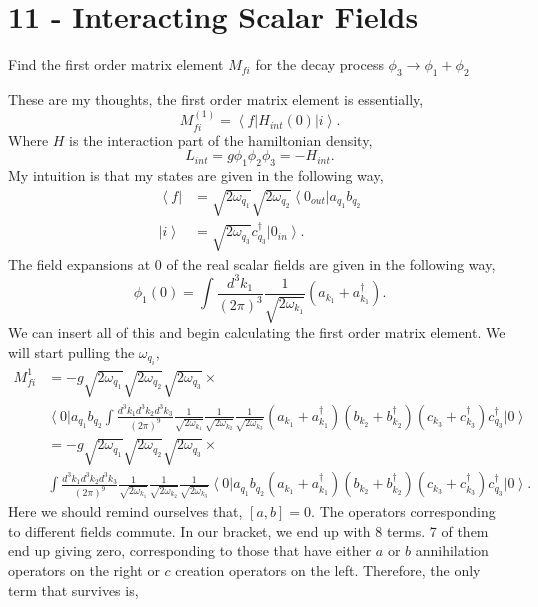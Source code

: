 \documentclass[working, oneside]{../../Preambles/tuftebook}
\begin{document}
\let\cleardoublepage\clearpage
\thispagestyle{fancy}
\chapter{11 - Interacting Scalar Fields}
\begin{exercise}[2]
Find the first order matrix element $M_{fi}$ for the decay process $\phi_3 \to \phi_1 + \phi_2$
\end{exercise}
These are my thoughts, the first order matrix element is essentially,
\[
M^{\left( 1 \right) }_{fi} = \left<f \right| H_{int}\left( 0 \right) \left|i \right>
.\] 
Where $H$ is the interaction part of the hamiltonian density,
\[
L_{int} = g\phi_1\phi_2\phi_3 = -H_{int}
.\]
My intuition is that my states are given in the following way,
\begin{align*}
    \left<f \right| &= \sqrt{2\omega_{q_1}}\sqrt{2\omega_{q_2}} \left<0_{out} \right|a_{q_1}b_{q_2}  \\
    \left|i \right> &= \sqrt{2\omega_{q_3}} c^\dagger_{q_3} \left|0_{in} \right>
.\end{align*}
The field expansions at $0$ of the real scalar fields are given in the following way,
 \[
\phi_1\left( 0 \right) = \int \frac{d^3k_1}{\left( 2\pi \right) ^3}\frac{1}{\sqrt{2\omega_{k_1}} }\left( a_{k_1} + a_{k_1}^\dagger \right)   
.\] 
We can insert all of this and begin calculating the first order matrix element. We will start pulling the $\omega_{q_i}$,
\begin{align*}
    M^{1}_{fi} &= -g\sqrt{2\omega_{q_1}} \sqrt{2\omega_{q_2}}\sqrt{2\omega_{q_3}} \times \\
    &\left<0 \right|a_{q_1}b_{q_2}\int \frac{d^3k_1d^3k_2d^3k_3}{\left( 2\pi \right) ^9}\frac{1}{\sqrt{2\omega_{k_1}} }\frac{1}{\sqrt{2\omega_{k_2}} }\frac{1}{\sqrt{2\omega_{k_3}} }\left( a_{k_1} + a_{k_1}^\dagger \right)   \left( b_{k_2} + b_{k_2}^\dagger \right)   \left( c_{k_3} + c_{k_3}^\dagger \right)  c_{q_3}^\dagger \left|0 \right> \\
 &=-g \sqrt{2\omega_{q_1}} \sqrt{2\omega_{q_2}}\sqrt{2\omega_{q_3}} \times \\
               & \int \frac{d^3k_1d^3k_2d^3k_3}{\left( 2\pi \right) ^9}\frac{1}{\sqrt{2\omega_{k_1}} }\frac{1}{\sqrt{2\omega_{k_2}} }\frac{1}{\sqrt{2\omega_{k_3}} }\left<0 \right|a_{q_1}b_{q_2}\left( a_{k_1} + a_{k_1}^\dagger \right)   \left( b_{k_2} + b_{k_2}^\dagger \right)   \left( c_{k_3} + c_{k_3}^\dagger \right)  c_{q_3}^\dagger \left|0 \right> 
.\end{align*}
Here we should remind ourselves that, $\left[ a, b \right]=0$. The operators corresponding to different fields commute. In our bracket, we end up with 8 terms. 7 of them end up giving zero, corresponding to those that have either $a$ or $b$ annihilation operators on the right or $c$ creation operators on the left. Therefore, the only term that survives is,
\end{document}
